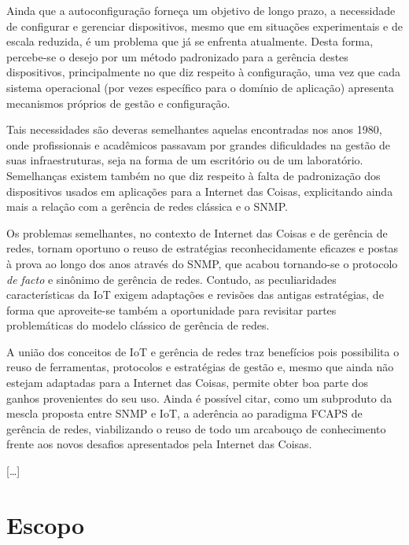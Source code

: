 \documentclass[twoside,english,brazilian]{UNISINOSmonografia}
\begin{document}
Ainda que a autoconfiguração forneça um objetivo de longo prazo, a necessidade 
de configurar e gerenciar dispositivos, mesmo que em situações experimentais e 
de escala reduzida, é um problema que já se enfrenta atualmente.
Desta forma, percebe-se o desejo por um método padronizado para a gerência  
destes dispositivos, principalmente no que diz respeito à configuração, uma 
vez que cada sistema operacional (por vezes específico para o domínio de 
aplicação) apresenta mecanismos próprios de gestão e configuração.


Tais necessidades são deveras semelhantes aquelas encontradas nos anos 1980, 
onde profissionais e acadêmicos passavam por grandes dificuldades na gestão 
de suas infraestruturas, seja na forma de um escritório ou de um laboratório.
Semelhanças existem também no que diz respeito à falta de padronização dos 
dispositivos usados em aplicações para a Internet das Coisas, explicitando 
ainda mais a relação com a gerência de redes clássica e o SNMP.


Os problemas semelhantes, no contexto de Internet das Coisas e de gerência de 
redes, tornam oportuno o reuso de estratégias reconhecidamente eficazes e 
postas à prova ao longo dos anos através do SNMP, que acabou tornando-se 
o protocolo \textit{de facto} e sinônimo de gerência de redes.
Contudo, as peculiaridades características da IoT exigem adaptações e revisões 
das antigas estratégias, de forma que aproveite-se também a oportunidade para 
revisitar partes problemáticas do modelo clássico de gerência de redes.


A união dos conceitos de IoT e gerência de redes traz benefícios pois 
possibilita o reuso de ferramentas, protocolos e estratégias de gestão e, 
mesmo que ainda não estejam adaptadas para a Internet das Coisas, permite 
obter boa parte dos ganhos provenientes do seu uso.
Ainda é possível citar, como um subproduto da mescla proposta entre SNMP e 
IoT, a aderência ao paradigma FCAPS de gerência de redes, viabilizando o 
reuso de todo um arcabouço de conhecimento frente aos novos desafios 
apresentados pela Internet das Coisas.


[\ldots]


\section{Escopo}
\end{document}
